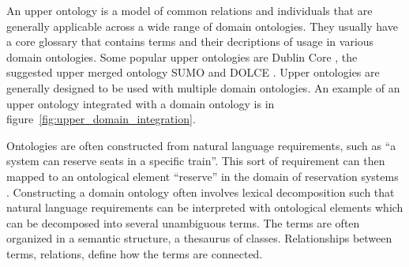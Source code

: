 An upper ontology is a model of common relations and individuals that are generally
applicable across a wide range of domain ontologies. They usually have
a core glossary that contains terms and their decriptions of usage in various 
domain ontologies. Some popular upper ontologies are Dublin Core \citep{weibel1998dublin}, 
the suggested upper merged ontology SUMO \citep{pease2002suggested} and
DOLCE \citep{gangemi2002sweetening}. 
Upper ontologies are generally designed to be used with multiple domain ontologies. 
An example of an upper ontology integrated with a domain ontology is in 
figure~\ref{fig:upper_domain_integration}. 



Ontologies are often constructed from natural language requirements, 
such as ``a system can reserve seats in a specific train''. This sort of requirement can
then mapped to an ontological element ``reserve'' in the domain of 
reservation systems \citep{kaiya2006using}. 
Constructing a domain ontology often involves lexical decomposition
\citep{pustejovsky2013type} such that natural language requirements 
can be interpreted with ontological elements which can be decomposed 
into several unambiguous terms. The terms are often organized in a semantic structure,
a thesaurus of classes. Relationships between terms, relations, define how 
the terms are connected. 


% 
% 
